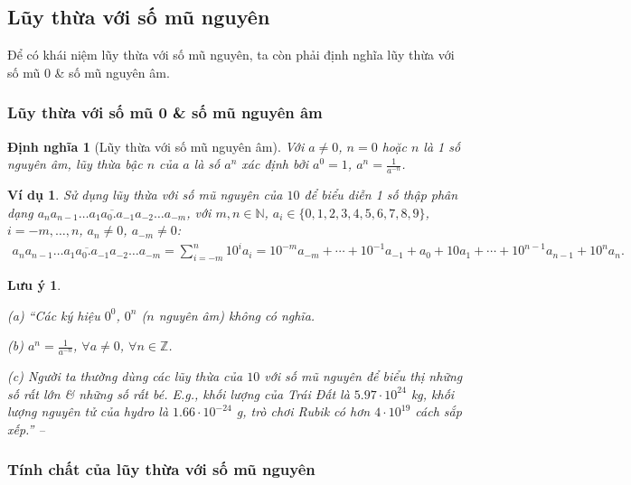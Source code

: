 \documentclass[oneside]{book}
\numberwithin{equation}{section}
\newtheorem{dinhnghia}{Định nghĩa}[section]
\newtheorem{vidu}{Ví dụ}[section]
\newtheorem{luuy}{Lưu ý}[section]
\begin{document}
\subsection{Lũy thừa với số mũ nguyên}
Để có khái niệm lũy thừa với số mũ nguyên, ta còn phải định nghĩa lũy thừa với số mũ 0 \& số mũ nguyên âm.

\subsubsection{Lũy thừa với số mũ 0 \& số mũ nguyên âm}

\begin{dinhnghia}[Lũy thừa với số mũ nguyên âm]
	Với $a\ne 0$, $n = 0$ hoặc $n$ là 1 số nguyên âm, \emph{lũy thừa bậc $n$ của $a$} là số $a^n$ xác định bởi $a^0 = 1$, $a^n = \frac{1}{a^{-n}}$.
\end{dinhnghia}

\begin{vidu}
	Sử dụng lũy thừa với số mũ nguyên của $10$ để biểu diễn 1 số thập phân dạng $\overline{a_na_{n-1}\ldots a_1a_0.a_{-1}a_{-2}\ldots a_{-m}}$, với $m,n\in\mathbb{N}$, $a_i\in\{0,1,2,3,4,5,6,7,8,9\}$, $i = -m,\ldots,n$, $a_n\ne 0$, $a_{-m}\ne 0$:
	\begin{align*}
		\overline{a_na_{n-1}\ldots a_1a_0.a_{-1}a_{-2}\ldots a_{-m}} = \sum_{i=-m}^n 10^ia_i = 10^{-m}a_{-m} + \cdots + 10^{-1}a_{-1} + a_0 + 10a_1 + \cdots + 10^{n-1}a_{n-1} + 10^na_n.
	\end{align*}
\end{vidu}

\begin{luuy}
	\begin{enumerate*}
		\item[(a)] ``Các ký hiệu $0^0$, $0^n$ ($n$ nguyên âm) không có nghĩa.
		\item[(b)] $a^n = \frac{1}{a^{-n}}$, $\forall a\ne 0$, $\forall n\in\mathbb{Z}$.
		\item[(c)] Người ta thường dùng các lũy thừa của $10$ với số mũ nguyên để biểu thị những số rất lớn \& những số rất bé. E.g., khối lượng của Trái Đất là $5.97\cdot 10^{24}$ kg, khối lượng nguyên tử của hydro là $1.66\cdot 10^{-24}$ g, trò chơi Rubik có hơn $4\cdot 10^{19}$ cách sắp xếp.'' -- \cite[p. 70]{SGK_Toan_12_giai_tich_nang_cao}
	\end{enumerate*}
\end{luuy}

\subsubsection{Tính chất của lũy thừa với số mũ nguyên}
\end{document}
